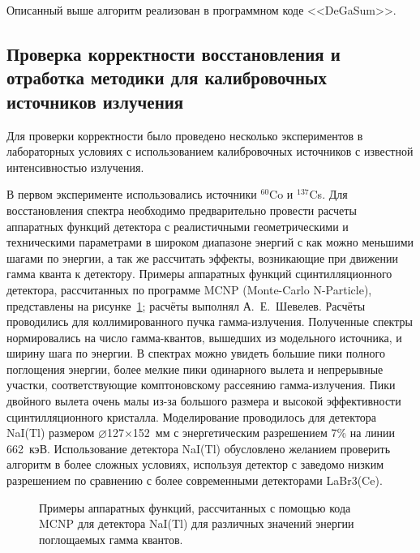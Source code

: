 Описанный выше алгоритм реализован в программном коде <<DeGaSum>>.~\cite{Khilkevitch2013}


\subsection{ Проверка корректности восстановления и отработка методики для калибровочных источников излучения }

Для проверки корректности было проведено несколько экспериментов в лабораторных условиях с использованием калибровочных источников с известной интенсивностью излучения. 

В первом эксперименте использовались источники ${}^{60}$Co и ${}^{137}$Cs. Для восстановления спектра необходимо предварительно провести расчеты аппаратных функций детектора с реалистичными геометрическими и техническими параметрами в широком диапазоне энергий с как можно меньшими шагами по энергии, а так же рассчитать эффекты, возникающие при движении гамма кванта к детектору. Примеры аппаратных функций сцинтилляционного детектора, рассчитанных по программе MCNP (Monte-Carlo N-Particle), представлены на рисунке~\ref{fig:mcnpInstFunctionsNaI}; расчёты выполнял А.~Е.~Шевелев. Расчёты проводились для коллимированного пучка гамма-излучения. Полученные спектры нормировались на число гамма-квантов, вышедших из модельного источника, и ширину шага по энергии. В спектрах можно увидеть большие пики полного поглощения энергии, более мелкие пики одинарного вылета и непрерывные участки, соответствующие комптоновскому рассеянию гамма-излучения. Пики двойного вылета очень малы из-за большого размера и высокой эффективности сцинтилляционного кристалла. Моделирование проводилось для детектора NaI(Tl) размером $\varnothing$127$\times$152~мм с энергетическим разрешением 7\% на линии 662~кэВ. Использование детектора NaI(Tl) обусловлено желанием проверить алгоритм в более сложных условиях, используя детектор с заведомо низким разрешением по сравнению с более современными детекторами LaBr3(Ce).

\begin{figure}[ht!]
  \caption{ Примеры аппаратных функций, рассчитанных с помощью кода MCNP для детектора NaI(Tl) для различных значений энергии поглощаемых гамма квантов.~\cite{Shevelev2013} }
  \label{fig:mcnpInstFunctionsNaI}
\end{figure}


